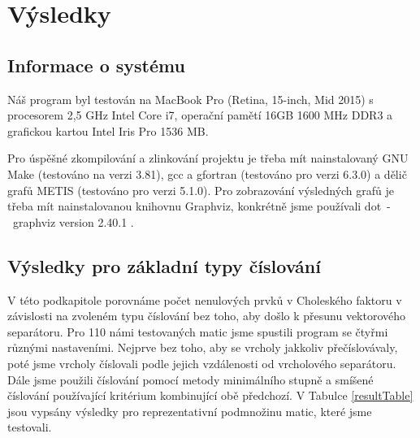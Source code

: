 \documentclass{ctuthesis}
\theoremstyle{plain}
\theoremstyle{definition}
\begin{document}
\chapter{Výsledky}

\section{Informace o systému}
Náš program byl testován na MacBook Pro (Retina, 15-inch, Mid 2015) s procesorem 2,5 GHz Intel Core i7, operační pamětí 16GB 1600 MHz DDR3 a grafickou kartou Intel Iris Pro 1536 MB.

Pro úspěšné zkompilování a zlinkování projektu je třeba mít nainstalovaný GNU Make (testováno na verzi 3.81), gcc a gfortran (testováno pro verzi 6.3.0) a dělič grafů METIS (testováno pro verzi 5.1.0). Pro zobrazování výsledných grafů je třeba mít nainstalovanou knihovnu Graphviz, konkrétně jsme používali dot~-~graphviz version 2.40.1 \cite{graphviz}.

\section{Výsledky pro základní typy číslování}
\label{numberingResultsSection}
V této podkapitole porovnáme počet nenulových prvků v Choleského faktoru v závislosti na zvoleném typu číslování bez toho, aby došlo k přesunu vektorového separátoru. Pro 110 námi testovaných matic jsme spustili program se čtyřmi různými nastaveními. Nejprve bez toho, aby se vrcholy jakkoliv přečíslovávaly, poté jsme vrcholy číslovali podle jejich vzdálenosti od vrcholového separátoru. Dále jsme použili číslování pomocí metody minimálního stupně a smíšené číslování používající kritérium kombinující obě předchozí. V Tabulce \ref{resultTable} jsou vypsány výsledky pro reprezentativní podmnožinu matic, které jsme testovali. 
\end{document}
